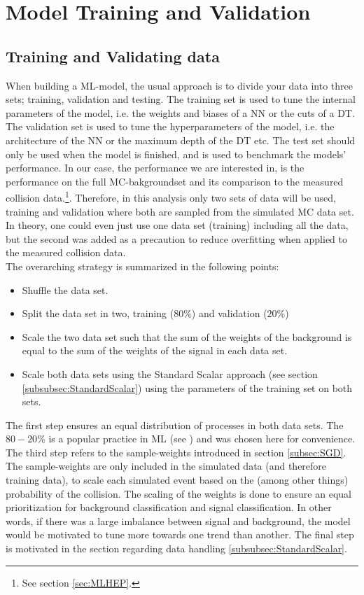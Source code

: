\section{Model Training and Validation}
\subsection{Training and Validating data}\label{subsec:TraVal}
When building a \ac{ML}-model, the usual approach is to divide your data into three sets; training, validation and 
testing. The training set is used to tune the internal parameters of the model, i.e. the weights and biases of a \ac{NN} or the cuts of a \ac{DT}.
The validation set is used to tune the hyperparameters of the model, i.e. the architecture of the \ac{NN} or the maximum depth of the \ac{DT} etc.
The test set should only be used when the model is finished, and is used to benchmark the models' performance. In our case, the performance we are 
interested in, is the performance on the full \ac{MC}-bakgroundset and its comparison to the measured collision data.\footnote{See section \ref{sec:MLHEP}.}. 
Therefore, in this analysis only two sets of data will be used, training and validation where both are sampled from the simulated
\ac{MC} data set. In theory, one could even just use one data set (training) including all the data, but the second was added as a precaution to reduce 
overfitting when applied to the measured collision data.
\\
The overarching strategy is summarized in the following points:
\begin{itemize}
    \item Shuffle the data set. 
    \item Split the data set in two, training ($80\%$) and validation ($20\%$)
    \item Scale the two data set such that the sum of the weights of the background is equal to the sum of the weights of the signal in each data set.
    \item Scale both data sets using the Standard Scalar approach (see section \ref{subsubsec:StandardScalar}) using the parameters of the training set 
          on both sets.
\end{itemize}
The first step ensures an equal distribution of processes in both data sets. The $80-20\%$ is a popular practice in \ac{ML} (see \cite{8020}) and was chosen 
here for convenience. The third step refers to the sample-weights introduced in section \ref{subsec:SGD}. The sample-weights are only included in the simulated data
(and therefore training data), to scale each simulated event based on the (among other things) probability of the collision. The scaling of the weights is done to 
ensure an equal prioritization for background classification and signal classification. In other words, if there was a large imbalance between signal and background, 
the model would be motivated to tune more towards one trend than another. The final step is motivated in the section regarding data handling \ref{subsubsec:StandardScalar}. 

